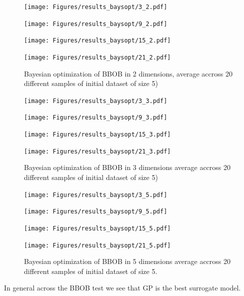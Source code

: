 \begin{figure}[H]
  \centering
  \begin{minipage}[b]{0.49\textwidth}
   \texttt{[image: Figures/results\_baysopt/3\_2.pdf]}
  \end{minipage}
  \hfill
  \begin{minipage}[b]{0.49\textwidth}
    \texttt{[image: Figures/results\_baysopt/9\_2.pdf]}
   \end{minipage}
   \begin{minipage}[b]{0.49\textwidth}
    \texttt{[image: Figures/results\_baysopt/15\_2.pdf]}
   \end{minipage}
   \hfill
   \begin{minipage}[b]{0.49\textwidth}
     \texttt{[image: Figures/results\_baysopt/21\_2.pdf]}
    \end{minipage}
  \caption{Bayesian optimization of BBOB in 2 dimensions, average accross 20 different samples of initial dataset of size 5)}
  \label{BBOB_bayesOpt}
\end{figure}

\begin{figure}[H]
  \centering
  \begin{minipage}[b]{0.49\textwidth}
   \texttt{[image: Figures/results\_baysopt/3\_3.pdf]}
  \end{minipage}
  \hfill
  \begin{minipage}[b]{0.49\textwidth}
    \texttt{[image: Figures/results\_baysopt/9\_3.pdf]}
   \end{minipage}
   \begin{minipage}[b]{0.49\textwidth}
    \texttt{[image: Figures/results\_baysopt/15\_3.pdf]}
   \end{minipage}
   \hfill
   \begin{minipage}[b]{0.49\textwidth}
     \texttt{[image: Figures/results\_baysopt/21\_3.pdf]}
    \end{minipage}
  \caption{Bayesian optimization of BBOB in 3 dimensions average accross 20 different samples of initial dataset of size 5)}
  \label{BBOB_bayesOpt}
\end{figure}


\begin{figure}[H]
  \centering
  \begin{minipage}[b]{0.49\textwidth}
   \texttt{[image: Figures/results\_baysopt/3\_5.pdf]}
  \end{minipage}
  \hfill
  \begin{minipage}[b]{0.49\textwidth}
    \texttt{[image: Figures/results\_baysopt/9\_5.pdf]}
   \end{minipage}
   \begin{minipage}[b]{0.49\textwidth}
    \texttt{[image: Figures/results\_baysopt/15\_5.pdf]}
   \end{minipage}
   \hfill
   \begin{minipage}[b]{0.49\textwidth}
     \texttt{[image: Figures/results\_baysopt/21\_5.pdf]}
    \end{minipage}
  \caption{Bayesian optimization of BBOB in 5 dimensions average accross 20 different samples of initial dataset of size 5.}
  \label{BBOB_bayesOpt5}
\end{figure}

In general across the BBOB test we see that GP is the best surrogate model. 